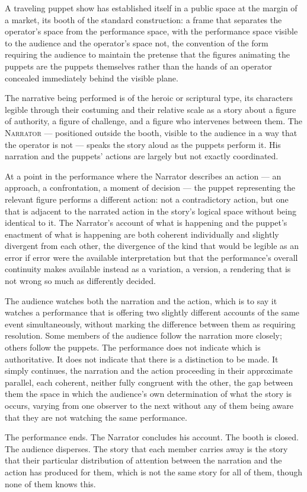 \documentclass[12pt, oneside]{article}
\newenvironment{action}{%
  \vspace{0.6em}%
  \noindent\ignorespaces%
}{%
  \par\vspace{0.6em}%
}
\begin{document}
\begin{action}
A traveling puppet show has established itself in a public space at the margin of a market, its booth of the standard construction: a frame that separates the operator's space from the performance space, with the performance space visible to the audience and the operator's space not, the convention of the form requiring the audience to maintain the pretense that the figures animating the puppets are the puppets themselves rather than the hands of an operator concealed immediately behind the visible plane.

The narrative being performed is of the heroic or scriptural type, its characters legible through their costuming and their relative scale as a story about a figure of authority, a figure of challenge, and a figure who intervenes between them. The \textsc{Narrator} --- positioned outside the booth, visible to the audience in a way that the operator is not --- speaks the story aloud as the puppets perform it. His narration and the puppets' actions are largely but not exactly coordinated.
\end{action}

\begin{action}
At a point in the performance where the Narrator describes an action --- an approach, a confrontation, a moment of decision --- the puppet representing the relevant figure performs a different action: not a contradictory action, but one that is adjacent to the narrated action in the story's logical space without being identical to it. The Narrator's account of what is happening and the puppet's enactment of what is happening are both coherent individually and slightly divergent from each other, the divergence of the kind that would be legible as an error if error were the available interpretation but that the performance's overall continuity makes available instead as a variation, a version, a rendering that is not wrong so much as differently decided.

The audience watches both the narration and the action, which is to say it watches a performance that is offering two slightly different accounts of the same event simultaneously, without marking the difference between them as requiring resolution. Some members of the audience follow the narration more closely; others follow the puppets. The performance does not indicate which is authoritative. It does not indicate that there is a distinction to be made. It simply continues, the narration and the action proceeding in their approximate parallel, each coherent, neither fully congruent with the other, the gap between them the space in which the audience's own determination of what the story is occurs, varying from one observer to the next without any of them being aware that they are not watching the same performance.

The performance ends. The Narrator concludes his account. The booth is closed. The audience disperses. The story that each member carries away is the story that their particular distribution of attention between the narration and the action has produced for them, which is not the same story for all of them, though none of them knows this.
\end{action}
\end{document}
